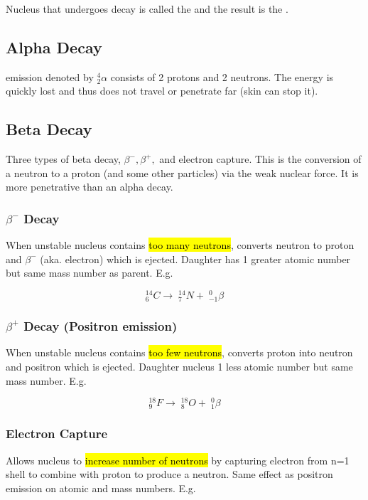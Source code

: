 \documentclass[../GChemReview.tex]{subfiles}
\begin{document}
  Nucleus that undergoes decay is called the  and the result
  is the .

  \subsection{Alpha Decay}

   emission denoted by $ ^{4}_{2} \alpha$ consists of 2
  protons and 2 neutrons. The energy is quickly lost and thus does not travel or
  penetrate far (skin can stop it).

  \subsection{Beta Decay}

  Three types of beta decay, $ \beta^{-}, \beta^{+}, $ and electron capture.
  This is the conversion of a neutron to a proton (and some other particles) via
  the weak nuclear force. It is more penetrative than an alpha decay.

  \subsubsection{$ \beta^{-} $ Decay}

  When unstable nucleus contains \hl{too many neutrons}, converts neutron to
  proton and $ \beta^{-} $ (aka. electron) which is ejected. Daughter has 1
  greater atomic number but same mass number as parent. E.g.

  \[ ^{14}_{6}C \rightarrow \; ^{14}_{7}N + \; ^{0}_{-1}\beta \]

  \subsubsection{$ \beta^{+} $ Decay (Positron emission)}

  When unstable nucleus contains \hl{too few neutrons}, converts proton into
  neutron and positron which is ejected. Daughter nucleus 1 less atomic number
  but same mass number. E.g.

  \[ ^{18}_{9}F \rightarrow \; ^{18}_{8}O + \; ^{0}_{1}\beta \]

  \subsubsection{Electron Capture}

  Allows nucleus to \hl{increase number of neutrons} by capturing electron from
  n=1 shell to combine with proton to produce a neutron. Same effect as positron
  emission on atomic and mass numbers. E.g.
\end{document}
